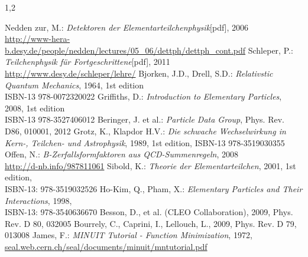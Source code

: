 \documentclass[11pt,a4paper,twoside]{report}
\begin{document}
\begin{spacing}{1,2}
\renewcommand{\bibname}{Literaturverzeichnis}
\addcontentsline{toc}{chapter}{\bibname}
% 
%
\begin{thebibliography}{xxx}
 Nedden zur, M.: \textit{Detektoren der Elementarteilchenphysik}[pdf], 2006\\ \href{http://www-hera-b.desy.de/people/nedden/lectures/05_06/dettph/dettph_cont.pdf}{http://www-hera-b.desy.de/people/nedden/lectures/05\_06/dettph/dettph\_cont.pdf}
 Schleper, P.: \textit{Teilchenphysik für Fortgeschrittene}[pdf], 2011\\ \href{http://www.desy.de/~schleper/lehre/}{http://www.desy.de/\midtilde schleper/lehre/}
 Bjorken, J.D., Drell, S.D.: \textit{Relativstic Quantum Mechanics}, 1964, 1st edition \\ISBN-13 978-0072320022 
 Griffiths, D.: \textit{Introduction to Elementary Particles}, 2008, 1st edition \\ISBN-13 978-3527406012
  Beringer, J. et al.: \textit{Particle Data Group}, Phys. Rev. D86, 010001, 2012
 Grotz, K., Klapdor H.V.: \textit{Die schwache Wechselwirkung in Kern-, Teilchen- und Astrophysik}, 1989, 1st edition, ISBN-13 978-3519030355
 Offen, N.: \textit{B-Zerfallsformfaktoren aus QCD-Summenregeln}, 2008\\ \href{http://d-nb.info/987811061}{http://d-nb.info/987811061}
 Sibold, K.: \textit{Theorie der Elementarteilchen}, 2001, 1st edition, \\ISBN-13: 978-3519032526
 Ho-Kim, Q., Pham, X.: \textit{Elementary Particles and Their Interactions}, 1998, \\ ISBN-13: 978-3540636670
 Besson, D., et al. (CLEO Collaboration), 2009, Phys. Rev. D 80, 032005 
 Bourrely, C., Caprini, I., Lellouch, L., 2009, Phys. Rev. D 79, 013008
 James, F.: \textit{MINUIT Tutorial - Function Minimization}, 1972, \\ \href{http://seal.web.cern.ch/seal/documents/minuit/mntutorial.pdf}{seal.web.cern.ch/seal/documents/minuit/mntutorial.pdf}
\end{thebibliography}



\newpage
\thispagestyle{empty}


\end{spacing}
\end{document}
